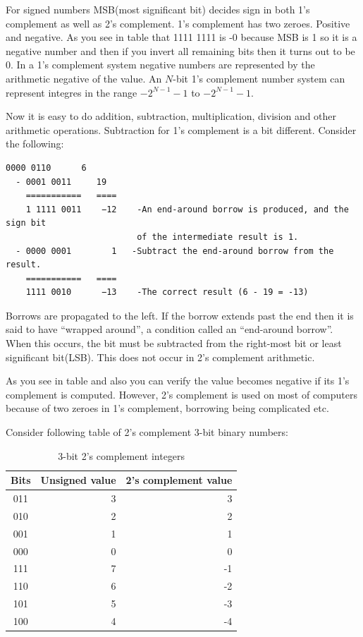 For signed numbers MSB(most significant bit) decides sign in both 1's
complement as well as 2's complement. 1's complement has two zeroes. Positive
and negative. As you see in table that 1111 1111 is -0 because MSB is 1 so it
is a negative number and then if you invert all remaining bits then it turns
out to be 0. In a 1's complement system negative numbers are represented by the
arithmetic negative of the value. An $N$-bit 1's complement number system can
represent integres in the range $-2^{N-1} - 1$ to $-2^{N-1} - 1$.

Now it is easy to do addition, subtraction, multiplication, division and other
arithmetic operations. Subtraction for 1's complement is a bit
different. Consider the following:

\begin{Verbatim}[frame=single]
    0000 0110      6
  - 0001 0011     19
    ===========   ====
    1 1111 0011    −12    -An end-around borrow is produced, and the sign bit
                          of the intermediate result is 1.
  - 0000 0001        1   -Subtract the end-around borrow from the result.
    ===========   ====
    1111 0010      −13    -The correct result (6 - 19 = -13)
\end{Verbatim}

Borrows are propagated to the left. If the borrow extends past the end then it
is said to have ``wrapped around'', a condition called an ``end-around
borrow''. When this occurs, the bit must be subtracted from the right-most bit
or least significant bit(LSB). This does not occur in 2's complement arithmetic.

As you see in table and also you can verify the value becomes negative if its
1's complement is computed. However, 2's complement is used on most of
computers because of two zeroes in 1's complement, borrowing being complicated
etc. 

Consider following table of 2's complement 3-bit binary numbers:

\begin{table}[H]
  \begin{center}
    \caption{3-bit 2's complement integers}
    \begin{tabular}{|c|r|r|}
      \hline
      \textbf{Bits}&\textbf{Unsigned value}&\textbf{2's complement value}\\
      \hline
      011&3&3\\
      \hline
      010&2&2\\
      \hline
      001&1&1\\
      \hline
      000&0&0\\
      \hline
      111&7&-1\\
      \hline
      110&6&-2\\
      \hline
      101&5&-3\\
      \hline
      100&4&-4\\
      \hline
    \end{tabular}
  \end{center}
\end{table}

